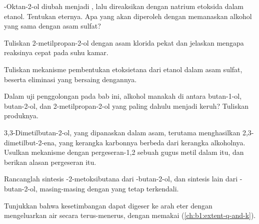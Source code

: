 \begin{exercise}[$\star\star$]\label{exo:b1:alcohol-activation:6}
-Oktan-2-ol diubah menjadi , lalu direaksikan dengan
natrium etoksida dalam etanol. Tentukan  eternya. Apa yang
akan diperoleh dengan memanaskan alkohol yang sama dengan asam sulfat?
\end{exercise}

\begin{exercise}[$\star\star$]\label{exo:b1:alcohol-activation:7}
Tuliskan  2-metilpropan-2-ol dengan asam klorida pekat
dan jelaskan mengapa reaksinya cepat pada suhu kamar.
\end{exercise}

\begin{exercise}[$\star\star$]\label{exo:b1:alcohol-activation:8}
Tuliskan mekanisme pembentukan etoksietana dari etanol dalam asam sulfat,
beserta eliminasi yang bersaing dengannya.
\end{exercise}

\begin{exercise}[$\star\star$]\label{exo:b1:alcohol-activation:9}
Dalam uji penggolongan pada bab ini, alkohol manakah di antara butan-1-ol,
butan-2-ol, dan 2-metilpropan-2-ol yang paling dahulu menjadi keruh?
Tuliskan produknya.
\end{exercise}

\begin{exercise}[$\star\star\star$]\label{exo:b1:alcohol-activation:10}
3,3-Dimetilbutan-2-ol, yang dipanaskan dalam asam, terutama menghasilkan
2,3-dimetilbut-2-ena, yang kerangka karbonnya berbeda dari kerangka
alkoholnya. Usulkan mekanisme dengan pergeseran-1,2 sebuah gugus metil
dalam  itu, dan berikan alasan pergeseran itu.
\end{exercise}

\begin{exercise}[$\star\star\star$]\label{exo:b1:alcohol-activation:11}
Rancanglah sintesis -2-metoksibutana dari -butan-2-ol, dan
sintesis lain dari -butan-2-ol, masing-masing dengan 
yang tetap terkendali.
\end{exercise}

\begin{exercise}[$\star\star\star$]\label{exo:b1:alcohol-activation:12}
Tunjukkan bahwa kesetimbangan  dapat
digeser ke arah eter dengan mengeluarkan air secara terus-menerus, dengan
memakai  (\cref{ch:b1:extent-q-and-k}).
\end{exercise}

